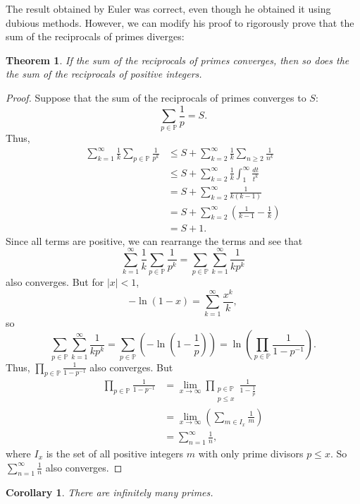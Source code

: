 \documentclass[a4paper]{article}
\newtheorem{theorem}{Theorem}[section]
\newtheorem{corollary}{Corollary}[theorem]
\theoremstyle{definition}
\theoremstyle{remark}
\begin{document}
The result obtained by Euler was correct, even though he obtained it using dubious methods. However, we can modify his proof to rigorously prove that the sum of the reciprocals of primes diverges:
\begin{theorem}
  If the sum of the reciprocals of primes converges, then so does the the sum of the reciprocals of positive integers.
  \label{thm:reciprocalPrimeDiverge}
\end{theorem}
\begin{proof}
  Suppose that the sum of the reciprocals of primes converges to $S$:
  \[
  \sum_{p\in\mathbb{P}}\frac{1}{p}=S
  .
  \]
  Thus,
  \begin{align*}
    \sum_{k=1}^\infty\frac{1}{k}\sum_{p\in\mathbb{P}}\frac{1}{p^k}&\le S + \sum_{k=2}^\infty\frac{1}{k}\sum_{n\ge2}\frac{1}{n^k}\\
    &\le S+\sum_{k=2}^\infty\frac{1}{k}\int_1^\infty\frac{dt}{t^k}\\
    &=S+\sum_{k=2}^\infty\frac{1}{k(k-1)}\\
    &=S+\sum_{k=2}^\infty\left( \frac{1}{k-1}-\frac{1}{k} \right)\\
    &=S+1
    .
  \end{align*}
  Since all terms are positive, we can rearrange the terms and see that
  \[
  \displaystyle\sum_{k=1}^\infty\frac{1}{k}\sum_{p\in\mathbb{P}}\frac{1}{p^k}=\sum_{p\in\mathbb{P}}\sum_{k=1}^\infty\frac{1}{kp^k}
  \]
  also converges. But for $|x|<1$, 
  \[
  -\ln(1-x)=\sum_{k=1}^\infty\frac{x^k}{k}
  ,
  \]
  so
  \[
  \sum_{p\in\mathbb{P}}\sum_{k=1}^\infty\frac{1}{kp^k}=\sum_{p\in\mathbb{P}}\left( -\ln\left( 1-\frac{1}{p} \right) \right)=\ln\left( \prod_{p\in\mathbb{P}}\frac{1}{1-p^{-1}} \right)
  .
  \]
  Thus, $\displaystyle\prod_{p\in\mathbb{P}}\frac{1}{1-p^{-1}}$ also converges. But
  \begin{align*}
    \prod_{p\in\mathbb{P}}\frac{1}{1-p^{-1}}&=\lim_{x\to\infty}\prod\limits_{\substack{p\in\mathbb{P}\\p\le x}}\frac{1}{1-\frac{1}{p}}\\
    &=\lim_{x\to\infty}\left( \sum_{m\in I_x}\frac{1}{m} \right)\\
    &=\sum_{n=1}^\infty\frac{1}{n}
    ,
  \end{align*}
  where $I_x$ is the set of all positive integers $m$ with only prime divisors $p\le x$.
  So $\displaystyle\sum_{n=1}^\infty\frac{1}{n}$ also converges.

\end{proof}
\begin{corollary}
  There are infinitely many primes.
  \label{cor:reciprocalPrimeDiverge}
\end{corollary}
\end{document}
